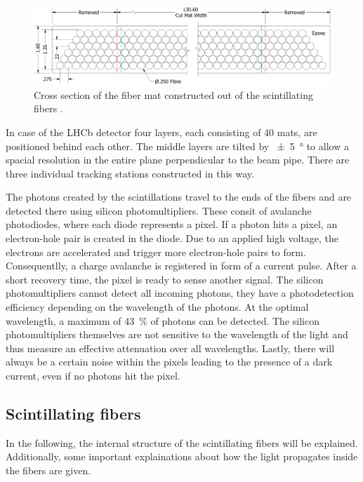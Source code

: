 \begin{figure}[H]
	\centering
	\includegraphics[width=0.9\linewidth]{pics/fiber_mat.png}
	\caption{Cross section of the fiber mat constructed out of the scintillating fibers \cite{SciFi}.}
	\label{fig:fiber-mats}
\end{figure}

In case of the LHCb detector four layers, each consisting of 40 mats, are positioned behind each other. The middle layers are tilted by \qty{+-5}{\degree}
to allow a spacial resolution in the entire plane perpendicular to the beam pipe. There are three individual tracking stations constructed in this way.

The photons created by the scintillations travel to the ends of the fibers and are detected there using silicon photomultipliers.
These consit of avalanche photodiodes, where each diode represents a pixel. If a photon hits a pixel, an electron-hole pair is created
in the diode. Due to an applied high voltage, the electrons are accelerated and trigger more electron-hole pairs to form.
Consequentlly, a charge avalanche is registered in form of a current pulse. After a short recovery time, the pixel is ready to sense another signal.
The silicon photomultipliers cannot detect all incoming photons, they have a photodetection efficiency depending on the wavelength of
the photons. At the optimal wavelength, a maximum of \qty{43}{\percent} of photons can be detected. The silicon photomultipliers themselves
are not sensitive to the wavelength of the light and thus measure an effective attenuation over all wavelengths. Lastly, there will
always be a certain noise within the pixels leading to the presence of a dark current, even if no photons hit the pixel.

\subsection{Scintillating fibers}

In the following, the internal structure of the scintillating fibers will be explained. Additionally, some important
explainations about how the light propagates inside the fibers are given.

